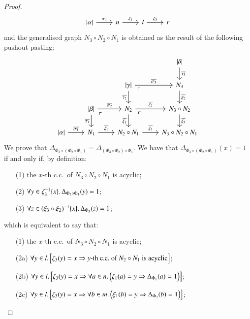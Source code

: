 \begin{proof}
\[\begin{tikzcd}
    \length\alpha \ar[r,"\sigma_1"] & n \ar[r,"\zeta_1"] & l \ar[r,"\zeta_3"] & r
    \end{tikzcd}
    \]
    and the generalised graph $N_3 \circ N_2 \circ N_1$ is obtained as the result of the following pushout-pasting:
    \[
    \begin{tikzcd}
    & & & \length\delta \ar[d,"\overline{\tau_3}"] \\
    & & \length\gamma \ar[r,"\overline{\sigma_3}"] \ar[d,"\overline{\tau_2}"'] \ar[dr, phantom, "\ulcorner" very near start] & N_3 \ar[d,"\overline{\xi_2}"] \\
    & \length\beta \ar[r,"\overline{\sigma_2}"] \ar[d,"\overline{\tau_1}"'] \ar[dr, phantom, "\ulcorner" very near start] & N_2 \ar[r,"\overline{\zeta_2}"] \ar[d,"\overline{\xi_1}"'] \ar[dr, phantom, "\ulcorner" very near start] & N_3 \circ N_2 \ar[d,"\overline{\xi_3}"] \\
    \length\alpha \ar[r,"\overline{\sigma_1}"] & N_1 \ar[r,"\overline{\zeta_1}"] & N_2 \circ N_1 \ar[r,"\overline{\zeta_3}"] & N_3 \circ N_2 \circ N_1
    \end{tikzcd}
    \]
    We prove that $\Delta_{\Phi_3 \circ (\Phi_2 \circ \Phi_1)} = \Delta_{(\Phi_3 \circ \Phi_2) \circ \Phi_1}$. We have that $\Delta_{\Phi_3 \circ (\Phi_2 \circ \Phi_1)}(x) = 1$ if and only if, by definition:
    \begin{enumerate}[labelindent=0pt]
        \item[(1)] the $x$-th c.c.\ of $N_3 \circ N_2 \circ N_1$ is acyclic;
        \item[(2)] $\forall y \in \zeta_3^{-1}\{x\} \ldotp \Delta_{\Phi_2 \circ \Phi_1}(y) = 1$;
        \item[(3)] $\forall z \in (\xi_3 \circ \xi_2)^{-1}\{x\} \ldotp \Delta_{\Phi_3}(z) = 1$;
    \end{enumerate}
    which is equivalent to say that:
    \begin{enumerate}[labelindent=0pt]
        \item[(1)] the $x$-th c.c.\ of $N_3 \circ N_2 \circ N_1$ is acyclic;
        \item[(2a)] $\forall y \in l \ldotp \Bigl[ \zeta_3(y) = x \implies \text{$y$-th c.c.\ of $N_2 \circ N_1$ is acyclic} \Bigr] $;
        \item[(2b)] $\forall y \in l \ldotp \Bigl[ \zeta_3(y) = x \implies \forall a \in n \ldotp \Bigl( \zeta_1(a)=y \implies \Delta_{\Phi_1}(a)=1 \Bigr) \Bigr] $;
        \item[(2c)] $\forall y \in l \ldotp \Bigl[ \zeta_3(y) = x \implies \forall b \in m \ldotp \Bigl( \xi_1(b)=y \implies \Delta_{\Phi_2}(b)=1 \Bigr) \Bigr] $;

\end{enumerate}
\end{proof}
